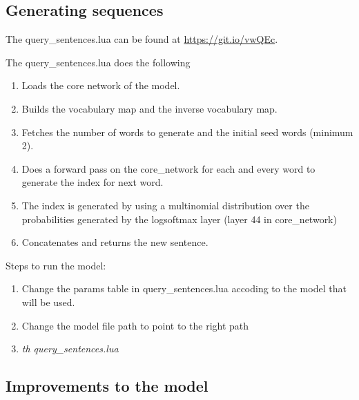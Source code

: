 \documentclass{article}
\begin{document}
\subsection{Generating sequences}
The query\_sentences.lua can be found at \url{https://git.io/vwQEc}.

The query\_sentences.lua does the following
\begin{enumerate}
  \item Loads the core network of the model.
  \item Builds the vocabulary map and the inverse vocabulary map.
  \item Fetches the number of words to generate and the initial seed words (minimum 2).
  \item Does a forward pass on the core\_network for each and every word to generate the index for next word.
  \item The index is generated by using a multinomial distribution over the probabilities generated by the logsoftmax layer (layer 44 in core\_network)
  \item Concatenates and returns the new sentence.
\end{enumerate}

Steps to run the model:  
\begin{enumerate}
  \item Change the params table in query\_sentences.lua accoding to the model that will be used.
  \item Change the model file path to point to the right path
  \item \textit{th query\_sentences.lua}
\end{enumerate}

\subsection{Improvements to the model}
\end{document}
